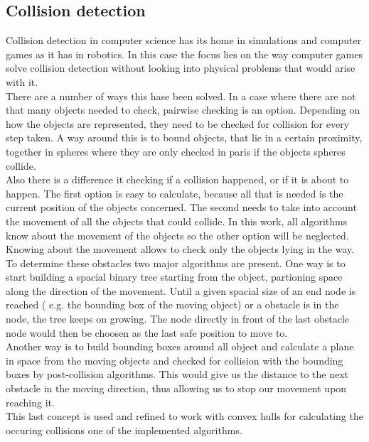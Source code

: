 \subsection{Collision detection}
Collision detection in computer science has its home in simulations and computer games as it has in robotics. In this case the focus lies on the way computer games solve collision detection without looking into physical problems that would arise with it.\\
There are a number of ways this hase been solved. In a case where there are not that many objects needed to check, pairwise checking is an option. Depending on how the objects are represented, they need to be checked for collision for every step taken. A way around this is to bound objects, that lie in a certain proximity, together in spheres where they are only checked in paris if the objects spheres collide.\\
Also there is a difference it checking if a collision happened, or if it is about to happen. The first option is easy to calculate, because all that is needed is the current position of the objects concerned. The second needs to take into account the movement of all the objects that could collide. In this work, all algorithms know about the movement of the objects so the other option will be neglected.\\
Knowing about the movement allows to check only the objects lying in the way. To determine these obstacles two major algorithms are present.
One way is to start building a spacial binary tree starting from the object, partioning space along the direction of the movement. Until a given spacial size of an end node is reached ( e.g. the bounding box of the moving object) or a obstacle is in the node, the tree keeps on growing. The node directly in front of the last obstacle node would then be choosen as the last safe position to move to.\\
Another way is to build bounding boxes around all object and calculate a plane in space from the moving objects  and checked for collision with the bounding boxes by post-collision algorithms. This would give us the distance to the next obstacle in the moving direction, thus allowing us to stop our movement upon reaching it.\\
This last concept is used and refined to work with convex hulls for calculating the occuring collisions one of the implemented algorithms.


